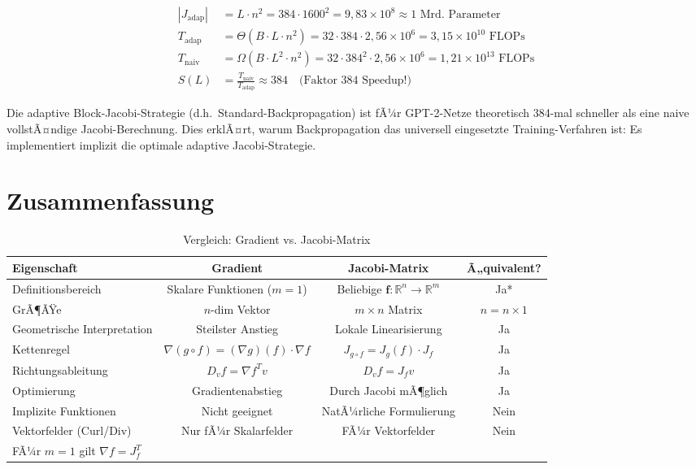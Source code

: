 ﻿\documentclass[a4paper,12pt]{article}
\theoremstyle{definition}
\begin{document}
\begin{align*}
	|J_{\mathrm{adap}}| &= L \cdot n^2 = 384 \cdot 1600^2 = 9{,}83 \times 10^8 \approx 1\text{ Mrd. Parameter} \\
	T_{\mathrm{adap}} &= \Theta(B \cdot L \cdot n^2) = 32 \cdot 384 \cdot 2{,}56 \times 10^6 = 3{,}15 \times 10^{10} \text{ FLOPs} \\
	T_{\mathrm{naiv}} &= \Omega(B \cdot L^2 \cdot n^2) = 32 \cdot 384^2 \cdot 2{,}56 \times 10^6 = 1{,}21 \times 10^{13} \text{ FLOPs} \\
	S(L) &= \frac{T_{\mathrm{naiv}}}{T_{\mathrm{adap}}} \approx 384 \quad \text{(Faktor 384 Speedup!)}
\end{align*}

Die adaptive Block-Jacobi-Strategie (d.h.\ Standard-Backpropagation) ist fÃ¼r GPT-2-Netze theoretisch 384-mal schneller als eine naive vollstÃ¤ndige Jacobi-Berechnung. Dies erklÃ¤rt, warum Backpropagation das universell eingesetzte Training-Verfahren ist: Es implementiert implizit die optimale adaptive Jacobi-Strategie.

\newpage
\section{Zusammenfassung}

\begin{table}[h]
	\centering
	\begin{tabular}{|l|c|c|c|}
		\toprule
		\textbf{Eigenschaft} & \textbf{Gradient} & \textbf{Jacobi-Matrix} & \textbf{Ã„quivalent?} \\
		\midrule
		Definitionsbereich & Skalare Funktionen ($m=1$) & Beliebige $\boldsymbol{f}: \mathbb{R}^n \to \mathbb{R}^m$ & Ja* \\
		GrÃ¶ÃŸe & $n$-dim Vektor & $m \times n$ Matrix & $n = n \times 1$ \\
		Geometrische Interpretation & Steilster Anstieg & Lokale Linearisierung & Ja \\
		Kettenregel & $\nabla(g \circ f) = (\nabla g)(f) \cdot \nabla f$ & $J_{g \circ f} = J_g(f) \cdot J_f$ & Ja \\
		Richtungsableitung & $D_v f = \nabla f^T v$ & $D_v f = J_f v$ & Ja \\
		Optimierung & Gradientenabstieg & Durch Jacobi mÃ¶glich & Ja \\
		Implizite Funktionen & Nicht geeignet & NatÃ¼rliche Formulierung & Nein \\
		Vektorfelder (Curl/Div) & Nur fÃ¼r Skalarfelder & FÃ¼r Vektorfelder & Nein \\
		\bottomrule
		\multicolumn{4}{l}{\small *FÃ¼r $m=1$ gilt $\nabla f = J_f^T$}
	\end{tabular}
	\caption{Vergleich: Gradient vs. Jacobi-Matrix}
	\label{tab:comparison}
\end{table}
\end{document}
